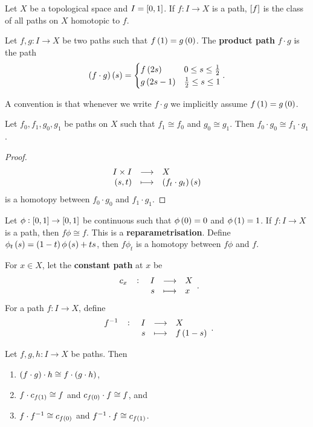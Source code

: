 
Let $ X $ be a topological space and $ I = \sbr{0, 1} $. If $ f : I \to X $ is a path, $ \sbr{f} $ is the class of all paths on $ X $ homotopic to $ f $.

\begin{definition*}
Let $ f, g : I \to X $ be two paths such that $ f\br{1} = g\br{0} $. The \textbf{product path} $ f \cdot g $ is the path
$$ \br{f \cdot g}\br{s} =
\begin{cases}
f\br{2s} & 0 \le s \le \tfrac{1}{2} \\
g\br{2s - 1} & \tfrac{1}{2} \le s \le 1
\end{cases}.
$$
\end{definition*}

A convention is that whenever we write $ f \cdot g $ we implicitly assume $ f\br{1} = g\br{0} $.

\begin{lemma}
\label{lem:1.2}
Let $ f_0, f_1, g_0, g_1 $ be paths on $ X $ such that $ f_1 \cong f_0 $ and $ g_0 \cong g_1 $. Then $ f_0 \cdot g_0 \cong f_1 \cdot g_1 $.
\end{lemma}

\begin{proof}
$$ \function{I \times I}{X}{\br{s, t}}{\br{f_t \cdot g_t}\br{s}} $$
is a homotopy between $ f_0 \cdot g_0 $ and $ f_1 \cdot g_1 $.
\end{proof}

\begin{remark*}
Let $ \phi : \sbr{0, 1} \to \sbr{0, 1} $ be continuous such that $ \phi\br{0} = 0 $ and $ \phi\br{1} = 1 $. If $ f : I \to X $ is a path, then $ f\phi \cong f $. This is a \textbf{reparametrisation}. Define $ \phi_t\br{s} = \br{1 - t}\phi\br{s} + ts $, then $ f\phi_t $ is a homotopy between $ f\phi $ and $ f $.
\end{remark*}

For $ x \in X $, let the \textbf{constant path} at $ x $ be
$$ \function[c_x]{I}{X}{s}{x}. $$
For a path $ f : I \to X $, define
$$ \function[f^{-1}]{I}{X}{s}{f\br{1 - s}}. $$

\begin{lemma}
\label{lem:1.3}
Let $ f, g, h : I \to X $ be paths. Then
\begin{enumerate}
\item $ \br{f \cdot g} \cdot h \cong f \cdot \br{g \cdot h} $,
\item $ f \cdot c_{f\br{1}} \cong f $ and $ c_{f\br{0}} \cdot f \cong f $, and
\item $ f \cdot f^{-1} \cong c_{f\br{0}} $ and $ f^{-1} \cdot f \cong c_{f\br{1}} $.
\end{enumerate}
\end{lemma}


